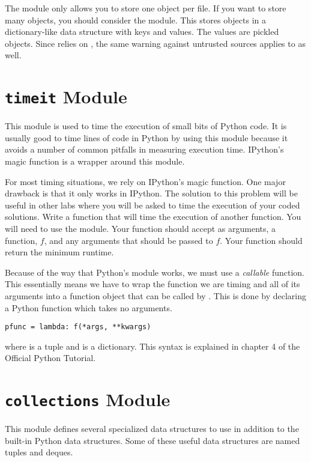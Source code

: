 The  module only allows you to store one object per file.
If you want to store many objects, you should consider the  module.
This stores objects in a dictionary-like data structure with keys and values.
The values are pickled objects.
Since  relies on , the same warning against untrusted sources applies to  as well.

\section*{\texttt{timeit} Module}
This module is used to time the execution of small bits of Python code.
It is usually good to time lines of code in Python by using this module because it avoids a number of common pitfalls in measuring execution time.
IPython's  magic function is a wrapper around this module.

\begin{problem}
For most timing situations, we rely on IPython's  magic function.
One major drawback is that it only works in IPython.
The solution to this problem will be useful in other labs where you will be asked to time the execution of your coded solutions.
Write a function that will time the execution of another function.
You will need to use the  module.
Your function should accept as arguments, a function, $f$, and any arguments that should be passed to $f$.
Your function should return the minimum runtime.

Because of the way that Python's  module works, we must use a \emph{callable} function.
This essentially means we have to wrap the function we are timing and all of its arguments into a function object that can be called by .
This is done by declaring a Python  function which takes no arguments.
\begin{lstlisting}
pfunc = lambda: f(*args, **kwargs)
\end{lstlisting}
where  is a tuple and  is a dictionary.
This syntax is explained in chapter 4 of the Official Python Tutorial.
\end{problem}

\section*{\texttt{collections} Module}
This module defines several specialized data structures to use in addition to the built-in Python data structures.
Some of these useful data structures are named tuples and deques.

